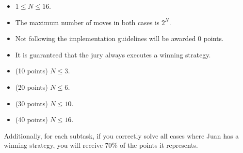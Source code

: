 \documentclass[12pt]{scrartcl}
\begin{document}

        \begin{itemize}
            \item $1 \le N \le 16$.
            \item The maximum number of moves in both cases is $2^N$.
            \item Not following the implementation guidelines will be awarded 0 points.
            \item It is guaranteed that the jury always executes a winning strategy.
        \end{itemize}

    
        \begin{itemize}
            \item (10 points) $N \le 3$.
            \item (20 points) $N \le 6$.
            \item (30 points) $N \le 10$.
            \item (40 points) $N \le 16$.
        \end{itemize}

        Additionally, for each subtask, if you correctly solve all cases where Juan has a winning strategy, you will receive 70\% of the points it represents.
\end{document}
